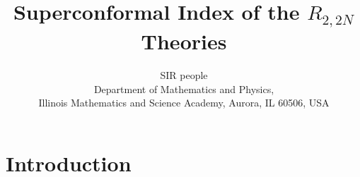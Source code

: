 \documentclass{JHEP3}
\title{Superconformal Index of the $R_{2,2N}$ Theories}
\author{SIR people \\
Department of Mathematics and Physics, \\
Illinois Mathematics and Science Academy, Aurora, IL 60506, USA}
\begin{document}
\maketitle

\section{Introduction}
\end{document}
